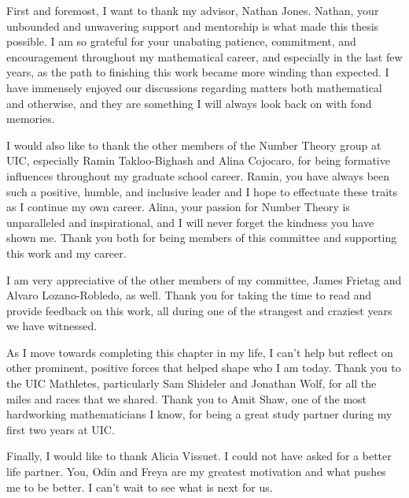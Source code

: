 \acknowledgment

First and foremost, I want to thank my advisor, Nathan Jones. Nathan, your unbounded and unwavering support and mentorship is what made this thesis possible. I am so grateful for your unabating patience, commitment, and encouragement throughout my mathematical career, and especially in the last few years, as the path to finishing this work became more winding than expected. I have immensely enjoyed our discussions regarding matters both mathematical and otherwise, and they are something I will always look back on with fond memories. 

I would also like to thank the other members of the Number Theory group at UIC, especially Ramin Takloo-Bighash and Alina Cojocaro, for being formative influences throughout my graduate school career. Ramin, you have always been such a positive, humble, and inclusive leader and I hope to effectuate these traits as I continue my own career. Alina, your passion for Number Theory is unparalleled and inspirational, and I will never forget the kindness you have shown me. Thank you both for being members of this committee and supporting this work and my career.

I am very appreciative of the other members of my committee, James Frietag and Alvaro Lozano-Robledo, as well. Thank you for taking the time to read and provide feedback on this work, all during one of the strangest and craziest years we have witnessed. 

As I move towards completing this chapter in my life, I can't help but reflect on other prominent, positive forces that helped shape who I am today. Thank you to the UIC Mathletes, particularly Sam Shideler and Jonathan Wolf, for all the miles and races that we shared. Thank you to Amit Shaw, one of the most hardworking mathematicians I know, for being a great study partner during my first two years at UIC.

Finally, I would like to thank Alicia Vissuet. I could not have asked for a better life partner. You, Odin and Freya are my greatest motivation and what pushes me to be better. I can't wait to see what is next for us.

